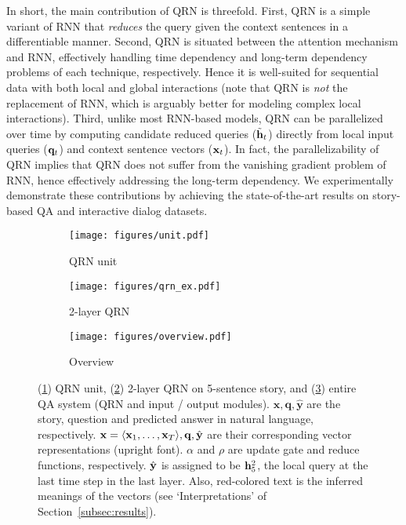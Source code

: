 \documentclass[table]{article}
\begin{document}
In short, the main contribution of QRN is threefold. 
First, QRN is a simple variant of RNN that {\it reduces} the query given the context sentences in a differentiable manner.
Second, QRN is situated between the attention mechanism and RNN, effectively handling time dependency and long-term dependency problems of each technique, respectively. 
Hence it is well-suited for sequential data with both local and global interactions (note that QRN is \emph{not} the replacement of RNN, which is arguably better for modeling complex local interactions).
Third, unlike most RNN-based models, QRN can be parallelized over time by computing candidate reduced queries ($\tilde{\bf h}_t$) directly from local input queries (${\bf q}_t$) and context sentence vectors (${\bf x}_t$).
In fact, the parallelizability of QRN implies that QRN does not suffer from the vanishing gradient problem of RNN, hence effectively addressing the long-term dependency.
We experimentally demonstrate these contributions by achieving the state-of-the-art results on story-based QA and interactive dialog datasets.


\begin{figure}[t]
\centering
\begin{subfigure}[htbp]{0.242\textwidth}
\texttt{[image: figures/unit.pdf]}
\caption{  QRN unit }
\label{fig:unit}
\end{subfigure}
\begin{subfigure}[htbp]{0.565\textwidth}
\centering
\texttt{[image: figures/qrn\_ex.pdf]}
\caption{2-layer QRN}
\label{fig:qrn_ex}
\end{subfigure}
\begin{subfigure}[htbp]{0.143\textwidth}
\centering
\texttt{[image: figures/overview.pdf]}
\caption{Overview}
\label{fig:overview}
\end{subfigure}
\caption{\small (\ref{fig:unit}) QRN unit, (\ref{fig:qrn_ex})  2-layer QRN on 5-sentence story, and (\ref{fig:overview}) entire QA system (QRN and input / output modules). 
    ${\bm x}, {\bm q}, \hat{\bm y}$ are the story, question and predicted answer in natural language, respectively.
    ${\bf x}=\langle {\bf x}_1, \ldots , {\bf x}_T \rangle, {\bf q}, \hat{\bf y}$ are their corresponding vector representations (upright font).
    $\alpha$ and $\rho$ are update gate and reduce functions, respectively.
    ${\hat {\bf y}}$ is  assigned to be ${\bf h}^2_5$, the local query at the last time step in the last layer.
    Also, red-colored text is the inferred meanings of the vectors (see `Interpretations' of Section~\ref{subsec:results}). }
\label{fig:model}
\end{figure}
\end{document}
